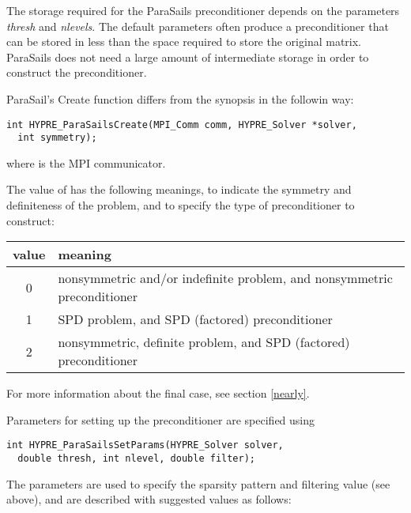 The storage required for the ParaSails preconditioner depends on
the parameters {\em thresh} and {\em nlevels}.  The default parameters
often produce a preconditioner that can be stored in less than the
space required to store the original matrix.
ParaSails does not need a large amount of intermediate storage in
order to construct the preconditioner.


ParaSail's Create function differs from the synopsis in the followin way:

\begin{display}
\begin{verbatim}
int HYPRE_ParaSailsCreate(MPI_Comm comm, HYPRE_Solver *solver,
  int symmetry);
\end{verbatim}
\end{display}
where  is the MPI communicator.

The value of  has the following meanings, to indicate
the symmetry and definiteness of the problem, and to specify the 
type of preconditioner to construct:
\begin{center}
\begin{tabular}{|c|l|} \hline
value & meaning \\ \hline
0 & nonsymmetric and/or indefinite problem, and nonsymmetric preconditioner \\
1 & SPD problem, and SPD (factored) preconditioner \\
2 & nonsymmetric, definite problem, and SPD (factored) preconditioner \\ 
\hline
\end{tabular}
\end{center}
For more information about the final case, see section \ref{nearly}.

Parameters for setting up the preconditioner are specified using
\begin{display}
\begin{verbatim}
int HYPRE_ParaSailsSetParams(HYPRE_Solver solver, 
  double thresh, int nlevel, double filter);
\end{verbatim}
\end{display}

The parameters are used to specify the sparsity pattern and filtering value
(see above), and are described with suggested values as follows:

